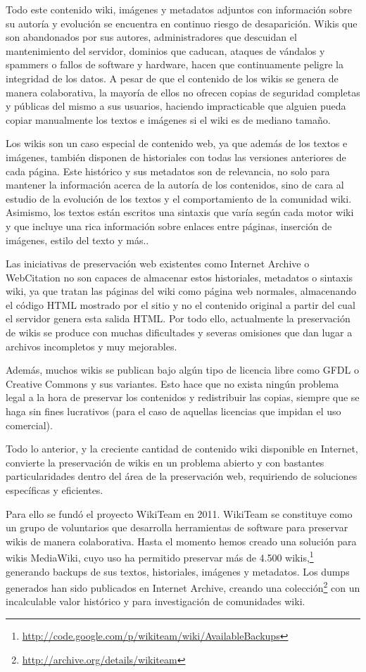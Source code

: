 \documentclass[11pt,twocolumn]{article}
\begin{document}
Todo este contenido wiki, imágenes y metadatos adjuntos con información sobre su autoría y evolución se encuentra en continuo riesgo de desaparición. Wikis que son abandonados por sus autores, administradores que descuidan el mantenimiento del servidor, dominios que caducan, ataques de vándalos y spammers o fallos de software y hardware, hacen que continuamente peligre la integridad de los datos. A pesar de que el contenido de los wikis se genera de manera colaborativa, la mayoría de ellos no ofrecen copias de seguridad completas y públicas del mismo a sus usuarios, haciendo impracticable que alguien pueda copiar manualmente los textos e imágenes si el wiki es de mediano tamaño.

Los wikis son un caso especial de contenido web, ya que además de los textos e imágenes, también disponen de historiales con todas las versiones anteriores de cada página. Este histórico y sus metadatos son de relevancia, no solo para mantener la información acerca de la autoría de los contenidos, sino de cara al estudio de la evolución de los textos y el comportamiento de la comunidad wiki. Asimismo, los textos están escritos una sintaxis que varía según cada motor wiki y que incluye una rica información sobre enlaces entre páginas, inserción de imágenes, estilo del texto y más..

Las iniciativas de preservación web existentes como Internet Archive o WebCitation no son capaces de almacenar estos historiales, metadatos o sintaxis wiki, ya que tratan las páginas del wiki como página web normales, almacenando el código HTML mostrado por el sitio y no el contenido original a partir del cual el servidor genera esta salida HTML. Por todo ello, actualmente la preservación de wikis se produce con muchas dificultades y severas omisiones que dan lugar a archivos incompletos y muy mejorables.

Además, muchos wikis se publican bajo algún tipo de licencia libre como GFDL o Creative Commons y sus variantes. Esto hace que no exista ningún problema legal a la hora de preservar los contenidos y redistribuir las copias, siempre que se haga sin fines lucrativos (para el caso de aquellas licencias que impidan el uso comercial).

Todo lo anterior, y la creciente cantidad de contenido wiki disponible en Internet, convierte la preservación de wikis en un problema abierto y con bastantes particularidades dentro del área de la preservación web, requiriendo de soluciones específicas y eficientes.

Para ello se fundó el proyecto WikiTeam en 2011. WikiTeam se constituye como un grupo de voluntarios que desarrolla herramientas de software para preservar wikis de manera colaborativa. Hasta el momento hemos creado una solución para wikis MediaWiki, cuyo uso ha permitido preservar más de 4.500 wikis,\footnote{\href{http://code.google.com/p/wikiteam/wiki/AvailableBackups}{http://code.google.com/p/wikiteam/wiki/AvailableBackups}} generando backups de sus textos, historiales, imágenes y metadatos. Los dumps generados han sido publicados en Internet Archive, creando una colección\footnote{\href{http://archive.org/details/wikiteam}{http://archive.org/details/wikiteam}} con un incalculable valor histórico y para investigación de comunidades wiki.
\end{document}
